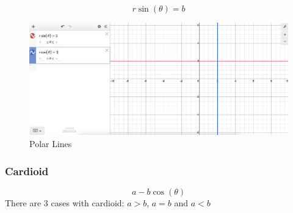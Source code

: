     \begin{equation}
        r\sin{(\theta)}=b
    \end{equation}
    \begin{figure}[H]
        \centering
        \includegraphics[width=\textwidth]{Pictures/Polar Line.png}
        \caption[]{Polar Lines \footnotemark}
        \label{polar lines}
    \end{figure}
    \newpage
    
\subsubsection{Cardioid}
    \begin{equation}
        a-b\cos{(\theta)}
    \end{equation}
    There are 3 cases with cardioid: $a>b$, $a=b$ and $a<b$
    
